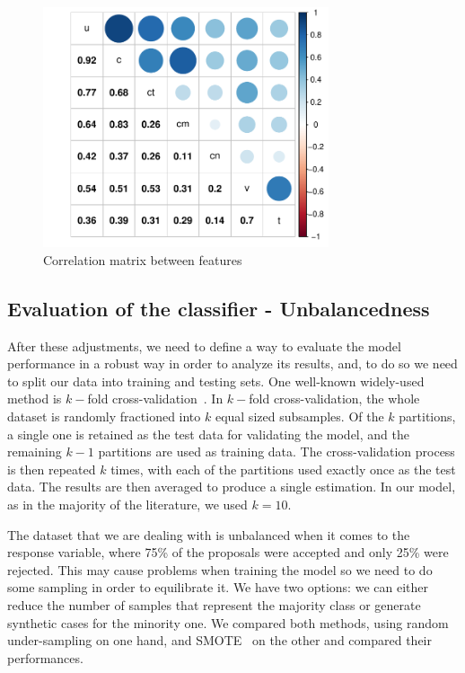 \begin{figure}[t!]
\centering
\includegraphics[width=0.75\textwidth]{Figures/corr.pdf}
\caption{Correlation matrix between features}
\label{corr}
\end{figure}

\subsection{Evaluation of the classifier - Unbalancedness}\label{sec:eval}

After these adjustments, we need to define a way to evaluate the model performance in a robust way in order to analyze its results, and, to do so we need to split our data into training and testing sets. One well-known widely-used method is $k-$fold cross-validation~\cite{cross-validation}.
In $k-$fold cross-validation, the whole dataset is randomly fractioned into $k$ equal sized subsamples. Of the $k$ partitions, a single one is retained as the test data for validating the model, and the remaining $k-1$ partitions are used as training data. The cross-validation process is then repeated $k$ times, with each of the partitions used exactly once as the test data. The results are then averaged to produce a single estimation. In our model, as in the majority of the literature, we used $k=10$.

The dataset that we are dealing with is unbalanced when it comes to the response variable, where 75\% of the proposals were accepted and only 25\% were rejected. This may cause problems when training the model so we need to do some sampling in order to equilibrate it. We have two options: we can either reduce the number of samples that represent the majority class or generate synthetic cases for the minority one. We compared both methods, using random under-sampling on one hand, and SMOTE~\cite{chawla2002smote} on the other and compared their performances. 

